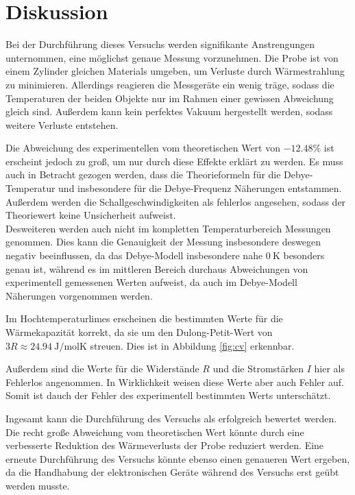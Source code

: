 \section{Diskussion}
\label{sec:Diskussion}

Bei der Durchführung dieses Versuchs werden signifikante Anstrengungen unternommen, eine möglichst genaue Messung vorzunehmen.
Die Probe ist von einem Zylinder gleichen Materials umgeben, um Verluste durch Wärmestrahlung zu minimieren.
Allerdings reagieren die Messgeräte ein wenig träge, sodass die Temperaturen der beiden Objekte nur im Rahmen einer gewissen Abweichung gleich sind. Außerdem kann kein perfektes Vakuum hergestellt werden, sodass weitere Verluste entstehen.

Die Abweichung des experimentellen vom theoretischen Wert von $-12.48\%$ ist erscheint jedoch zu groß, um nur durch diese Effekte erklärt zu werden. Es muss auch in Betracht gezogen werden, dass die Theorieformeln für die Debye-Temperatur und insbesondere für die Debye-Frequenz Näherungen entstammen. Außerdem werden die Schallgeschwindigkeiten als fehlerlos angesehen, sodass der Theoriewert keine Unsicherheit aufweist.\\
Desweiteren werden auch nicht im kompletten Temperaturbereich Messungen genommen. Dies kann die Genauigkeit der Messung insbesondere deswegen negativ beeinflussen, da das Debye-Modell insbesondere nahe $\SI{0}{\kelvin}$ besonders genau ist, während es im mittleren Bereich durchaus Abweichungen von experimentell gemessenen Werten aufweist, da auch im Debye-Modell Näherungen vorgenommen werden.

Im Hochtemperaturlimes erscheinen die bestimmten Werte für die Wärmekapazität korrekt,
da sie um den Dulong-Petit-Wert von $3R \approx \SI{24.94}{\joule\per\mole\kelvin}$ streuen.
Dies ist in Abbildung \ref{fig:cv} erkennbar.

Außerdem sind die Werte für die Widerstände $R$ und die Stromstärken $I$ hier als
Fehlerlos angenommen. In Wirklichkeit weisen diese Werte aber auch Fehler auf. Somit ist dauch der Fehler des experimentell bestimmten Werts unterschätzt.

Ingesamt kann die Durchführung des Versuchs als erfolgreich bewertet werden.
Die recht große Abweichung vom theoretischen Wert könnte durch eine verbesserte Reduktion des Wärmeverlusts der Probe reduziert werden.
Eine erneute Durchführung des Versuchs könnte ebenso einen genaueren Wert ergeben, da die Handhabung der elektronischen Geräte während des Versuchs erst geübt werden musste.

%
%
%
